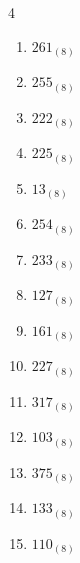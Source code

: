 \begin{multicols}{4}
\begin{enumerate}
  \item $261_{(8)}$

        \phantom{$=177$}

  \item $255_{(8)}$

        \phantom{$=173$}

  \item $222_{(8)}$

        \phantom{$=146$}

  \item $225_{(8)}$

        \phantom{$=149$}

  \item $13_{(8)}$

        \phantom{$=11$}

  \item $254_{(8)}$

        \phantom{$=172$}

  \item $233_{(8)}$

        \phantom{$=155$}

\columnbreak %

\resetques

  \item $127_{(8)}$

        \phantom{$=87$}

  \item $161_{(8)}$

        \phantom{$=113$}

  \item $227_{(8)}$

        \phantom{$=151$}

  \item $317_{(8)}$

        \phantom{$=207$}

  \item $103_{(8)}$

        \phantom{$=67$}

  \item $375_{(8)}$

        \phantom{$=253$}

  \item $133_{(8)}$

        \phantom{$=91$}

  \item $110_{(8)}$

        \phantom{$=72$}


\end{enumerate}
\end{multicols}
